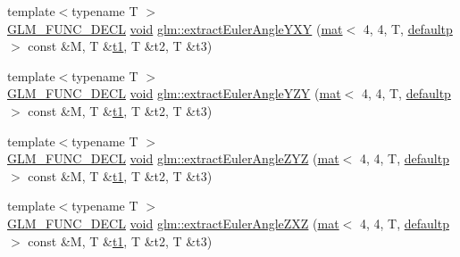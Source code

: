 \begin{DoxyCompactItemize}
\item 
{\footnotesize template$<$typename T $>$ }\\\hyperlink{setup_8hpp_ab2d052de21a70539923e9bcbf6e83a51}{G\+L\+M\+\_\+\+F\+U\+N\+C\+\_\+\+D\+E\+CL} \hyperlink{_s_d_l__opengles2__gl2ext_8h_ae5d8fa23ad07c48bb609509eae494c95}{void} \hyperlink{group__gtx__euler__angles_gaab8868556361a190db94374e9983ed39}{glm\+::extract\+Euler\+Angle\+Y\+XY} (\hyperlink{structglm_1_1mat}{mat}$<$ 4, 4, T, \hyperlink{namespaceglm_a36ed105b07c7746804d7fdc7cc90ff25a9d21ccd8b5a009ec7eb7677befc3bf51}{defaultp} $>$ const \&M, T \&\hyperlink{_s_d_l__opengl__glext_8h_af48031a37b713afa3b0d0d7d29653d7c}{t1}, T \&t2, T \&t3)
\item 
{\footnotesize template$<$typename T $>$ }\\\hyperlink{setup_8hpp_ab2d052de21a70539923e9bcbf6e83a51}{G\+L\+M\+\_\+\+F\+U\+N\+C\+\_\+\+D\+E\+CL} \hyperlink{_s_d_l__opengles2__gl2ext_8h_ae5d8fa23ad07c48bb609509eae494c95}{void} \hyperlink{group__gtx__euler__angles_ga11dad972c109e4bf8694c915017c44a6}{glm\+::extract\+Euler\+Angle\+Y\+ZY} (\hyperlink{structglm_1_1mat}{mat}$<$ 4, 4, T, \hyperlink{namespaceglm_a36ed105b07c7746804d7fdc7cc90ff25a9d21ccd8b5a009ec7eb7677befc3bf51}{defaultp} $>$ const \&M, T \&\hyperlink{_s_d_l__opengl__glext_8h_af48031a37b713afa3b0d0d7d29653d7c}{t1}, T \&t2, T \&t3)
\item 
{\footnotesize template$<$typename T $>$ }\\\hyperlink{setup_8hpp_ab2d052de21a70539923e9bcbf6e83a51}{G\+L\+M\+\_\+\+F\+U\+N\+C\+\_\+\+D\+E\+CL} \hyperlink{_s_d_l__opengles2__gl2ext_8h_ae5d8fa23ad07c48bb609509eae494c95}{void} \hyperlink{group__gtx__euler__angles_gafdfa880a64b565223550c2d3938b1aeb}{glm\+::extract\+Euler\+Angle\+Z\+YZ} (\hyperlink{structglm_1_1mat}{mat}$<$ 4, 4, T, \hyperlink{namespaceglm_a36ed105b07c7746804d7fdc7cc90ff25a9d21ccd8b5a009ec7eb7677befc3bf51}{defaultp} $>$ const \&M, T \&\hyperlink{_s_d_l__opengl__glext_8h_af48031a37b713afa3b0d0d7d29653d7c}{t1}, T \&t2, T \&t3)
\item 
{\footnotesize template$<$typename T $>$ }\\\hyperlink{setup_8hpp_ab2d052de21a70539923e9bcbf6e83a51}{G\+L\+M\+\_\+\+F\+U\+N\+C\+\_\+\+D\+E\+CL} \hyperlink{_s_d_l__opengles2__gl2ext_8h_ae5d8fa23ad07c48bb609509eae494c95}{void} \hyperlink{group__gtx__euler__angles_ga59359fef9bad92afaca55e193f91e702}{glm\+::extract\+Euler\+Angle\+Z\+XZ} (\hyperlink{structglm_1_1mat}{mat}$<$ 4, 4, T, \hyperlink{namespaceglm_a36ed105b07c7746804d7fdc7cc90ff25a9d21ccd8b5a009ec7eb7677befc3bf51}{defaultp} $>$ const \&M, T \&\hyperlink{_s_d_l__opengl__glext_8h_af48031a37b713afa3b0d0d7d29653d7c}{t1}, T \&t2, T \&t3)

\end{DoxyCompactItemize}
